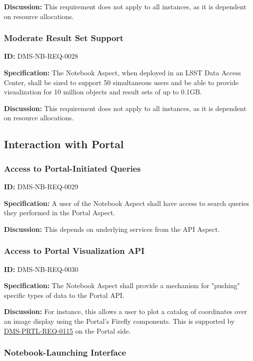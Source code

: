 \documentclass[SE,toc,lsstdraft]{lsstdoc}
\begin{document}
\textbf{Discussion:}
This requirement does not apply to all instances, as it is dependent on resource allocations.

\subsubsection{Moderate Result Set Support}

\label{DMS-NB-REQ-0028}
\textbf{ID:} DMS-NB-REQ-0028

\textbf{Specification:}
The Notebook Aspect, when deployed in an LSST Data Access Center, shall be sized to support 50 simultaneous users and be able to provide visualization for 10 million objects and result sets of up to 0.1GB.

\textbf{Discussion:}
This requirement does not apply to all instances, as it is dependent on resource allocations.

\subsection{Interaction with Portal}

\subsubsection{Access to Portal-Initiated Queries}

\label{DMS-NB-REQ-0029}
\textbf{ID:} DMS-NB-REQ-0029

\textbf{Specification:}
A user of the Notebook Aspect shall have access to search queries they performed in the Portal Aspect.

\textbf{Discussion:}
This depends on underlying services from the API Aspect.

\subsubsection{Access to Portal Visualization API}

\label{DMS-NB-REQ-0030}
\textbf{ID:} DMS-NB-REQ-0030

\textbf{Specification:}
The Notebook Aspect shall provide a mechanism for "pushing" specific types of data to the Portal API.

\textbf{Discussion:}
For instance, this allows a user to plot a catalog of coordinates over an image display using the Portal's Firefly components.  This is supported by \hyperref[DMS-PRTL-REQ-0115]{DMS-PRTL-REQ-0115} on the Portal side.

\subsubsection{Notebook-Launching Interface}
\end{document}
